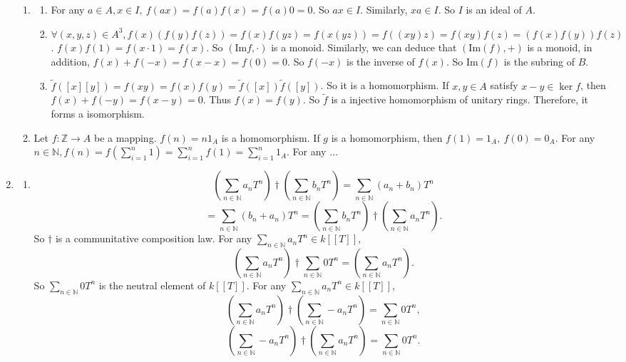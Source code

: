 \documentclass[12pt]{article}
\newcommand{\NN}{\mathbb{N}}
\newcommand{\ZZ}{\mathbb{Z}}
\begin{document}
\begin{enumerate}
\begin{enumerate}
            \item 
                \begin{enumerate}
                    \item For any $a\in A,x\in I,\ f(ax)=f(a)f(x)=f(a)0=0.$ So $ax\in I$. Similarly, $xa\in I$. So $I$ is an ideal of $A$.
                    \item $\forall (x,y,z)\in A^3, f(x)\left(f(y)f(z)\right)=f(x)f(yz)=f(x(yz))=f((xy)z)=f(xy)f(z)=\left(f(x)f(y)\right)f(z)$. $f(x)f(1)=f(x\cdot1)=f(x)$. So $\left(\mathrm{Im}f,\cdot\right)$ is a monoid. Similarly, we can deduce that $\left(\mathrm{Im}(f),+\right)$ is a monoid, in addition, $f(x)+f(-x)=f(x-x)=f(0)=0$. So $f(-x)$ is the inverse of $f(x)$. So $\mathrm{Im}(f)$ is the subring of $B$.
                    \item $\tilde{f}\left([x][y]\right)=f(xy)=f(x)f(y)=\tilde{f}\left([x]\right)\tilde{f}\left([y]\right)$. So it is a homomorphism. If $x,y\in A$ satisfy $x -y\in \ker{f}$, then $f(x)+f(-y)=f(x-y)=0.$ Thus $f(x)=f(y)$. So $\tilde{f}$ is a injective homomorphism of unitary rings. Therefore, it forms a isomorphism.
                \end{enumerate}
            \item Let $f:\ZZ\rightarrow A$ be a mapping. $f(n)=n1_A$ is a homomorphism. If $g$ is a homomorphism, then $f(1)=1_A,\ f(0)=0_A$. For any $n\in \NN, f(n)=f\left(\sum_{i=1}^{n}1\right)=\sum_{i=1}^{n}f(1)=\sum_{i=1}^{n}1_A$. For any $\dots$ 
        \end{enumerate}
    \item 
        \begin{enumerate}
            \item $$\left(\sum_{n\in \NN}a_nT^n\right)\dagger \left(\sum_{n\in \NN}b_nT^n\right)=\sum_{n\in \NN}(a_n+b_n)T^n$$
            $$=\sum_{n\in \NN}(b_n+a_n)T^n=\left(\sum_{n\in \NN}b_nT^n\right)\dagger\left(\sum_{n\in \NN}a_nT^n\right).$$
            So $\dagger$ is a communitative composition law.
            \newline
            For any $\sum_{n\in \NN}a_nT^n\in k[[T]]$,
            $$\left(\sum_{n\in \NN}a_nT^n\right)\dagger\sum_{n\in \NN}0T^n=\left(\sum_{n\in \NN}a_nT^n\right).$$
            So $\sum_{n\in\NN}0T^n$ is the neutral element of $k[[T]]$.
            \newline
            For any $\sum_{n\in \NN}a_nT^n\in k[[T]]$,
            $$\left(\sum_{n\in \NN}a_nT^n\right)\dagger\left(\sum_{n\in \NN}-a_nT^n\right)=\sum_{n\in \NN}0T^n,$$
            $$\left(\sum_{n\in \NN}-a_nT^n\right)\dagger\left(\sum_{n\in \NN}a_nT^n\right)=\sum_{n\in \NN}0T^n.$$

\end{enumerate}
\end{enumerate}
\end{document}
